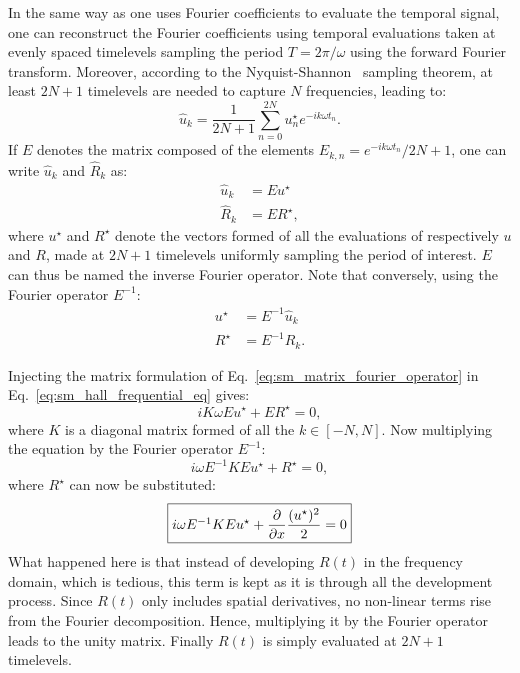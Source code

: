 In the same way as one uses Fourier coefficients to
evaluate the temporal signal,
one can reconstruct the Fourier coefficients using
temporal evaluations taken at evenly spaced timelevels
sampling the period $T = 2 \pi / \omega$ using the forward
Fourier transform. Moreover, 
according to the Nyquist-Shannon~\cite{Shannon1949} sampling theorem, 
at least $2N+1$ timelevels are needed to capture $N$ frequencies,
leading to:
\begin{equation}
	\widehat{u}_k = \frac{1}{2N+1} 
	\sum_{n=0}^{2N} u_n^\star e^{-i k \omega t_n}.
\end{equation}
If $E$ denotes the matrix composed of the elements 
$E_{k,n} = e^{-i k \omega t_n} / 2N+1$, one can write $\widehat{u}_k$
and $\widehat{R}_k$ as:
\begin{equation}
	\begin{split}
		\widehat{u}_k &= E u^\star \\
		\widehat{R}_k &= E R^\star,
	\end{split}
	\label{eq:sm_matrix_fourier_operator}
\end{equation}
where $u^\star$ and $R^\star$ 
denote the vectors formed of all the evaluations of respectively $u$
and $R$,
made at $2N+1$ timelevels uniformly sampling the period of interest. 
$E$ can thus be named the inverse Fourier operator.
Note that conversely, using the Fourier operator $E^{-1}$:
\begin{equation}
	\begin{split}
		u^\star &= E^{-1} \widehat{u}_k \\
		R^\star &= E^{-1} \widehat{R}_k.
	\end{split}
\end{equation}

Injecting the matrix formulation of 
Eq.~\ref{eq:sm_matrix_fourier_operator} in 
Eq.~\ref{eq:sm_hall_frequential_eq}
gives:
\begin{equation}
	i K \omega E u^\star + E R^\star = 0,
\end{equation}
where $K$ is a diagonal matrix formed of all the $k \in [-N, N]$.
Now multiplying the equation by the Fourier operator $E^{-1}$:
\begin{equation}
	i \omega E^{-1} K E u^\star + R^\star = 0,
\end{equation}
where $R^\star$ can now be substituted:
\begin{equation}
	\fbox{$
		i \omega E^{-1} K E u^\star + 
		\displaystyle \frac{\partial}{\partial x}
		\frac{(u^\star)^2}{2} = 0
	$}
\end{equation}
What happened here is that instead of developing $R(t)$
in the frequency domain, which is tedious, this term is kept
as it is through all the development process. 
Since $R(t)$ only includes spatial derivatives, no non-linear
terms
rise from the Fourier decomposition. Hence, multiplying it
by the Fourier operator leads to the unity matrix. 
Finally $R(t)$ is simply evaluated at $2N+1$ timelevels.

